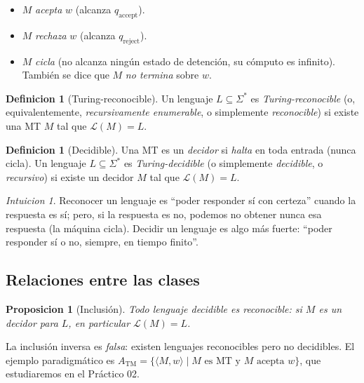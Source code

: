 \documentclass[11pt,a4paper]{article}
\theoremstyle{plain}
\newtheorem{proposicion}[teorema]{Proposicion}
\theoremstyle{definition}
\newtheorem{definicion}[teorema]{Definicion}
\theoremstyle{remark}
\newtheorem*{intuicion}{Intuicion}
\newcommand{\TM}{\mathrm{TM}}
\newcommand{\enc}[1]{\langle #1\rangle}
\newcommand{\lang}{\mathcal{L}}
\newcommand{\Sstar}{\Sigma^{*}}
\newcommand{\qaccept}{q_{\text{accept}}}
\newcommand{\qreject}{q_{\text{reject}}}
\newcommand{\ATM}{A_{\TM}}
\begin{document}
\begin{itemize}
  \item $M$ \emph{acepta} $w$ (alcanza $\qaccept$).
  \item $M$ \emph{rechaza} $w$ (alcanza $\qreject$).
  \item $M$ \emph{cicla} (no alcanza ning\'un estado de detenci\'on, su
        c\'omputo es infinito). Tambi\'en se dice que $M$ \emph{no termina}
        sobre $w$.
\end{itemize}

\begin{definicion}[Turing-reconocible]
\label{def:reconocible}
Un lenguaje $L\subseteq\Sstar$ es \emph{Turing-reconocible} (o,
equivalentemente, \emph{recursivamente enumerable}, o simplemente
\emph{reconocible}) si existe una MT $M$ tal que $\lang(M)=L$.
\end{definicion}

\begin{definicion}[Decidible]
\label{def:decidible}
Una MT es un \emph{decidor} si \emph{halta} en toda entrada (nunca cicla).
Un lenguaje $L\subseteq\Sstar$ es \emph{Turing-decidible} (o simplemente
\emph{decidible}, o \emph{recursivo}) si existe un decidor $M$ tal que
$\lang(M)=L$.
\end{definicion}

\begin{intuicion}
Reconocer un lenguaje es ``poder responder s\'i con certeza'' cuando la
respuesta es s\'i; pero, si la respuesta es no, podemos no obtener nunca esa
respuesta (la m\'aquina cicla). Decidir un lenguaje es algo m\'as fuerte:
``poder responder s\'i o no, siempre, en tiempo finito''.
\end{intuicion}

\subsection{Relaciones entre las clases}

\begin{proposicion}[Inclusi\'on]
Todo lenguaje decidible es reconocible: si $M$ es un decidor para $L$, en
particular $\lang(M)=L$.
\end{proposicion}

La inclusi\'on inversa es \emph{falsa}: existen lenguajes reconocibles pero
no decidibles. El ejemplo paradigm\'atico es $\ATM=\{\enc{M,w}\mid M
\text{ es MT y } M \text{ acepta }w\}$, que estudiaremos en el Pr\'actico 02.
\end{document}
